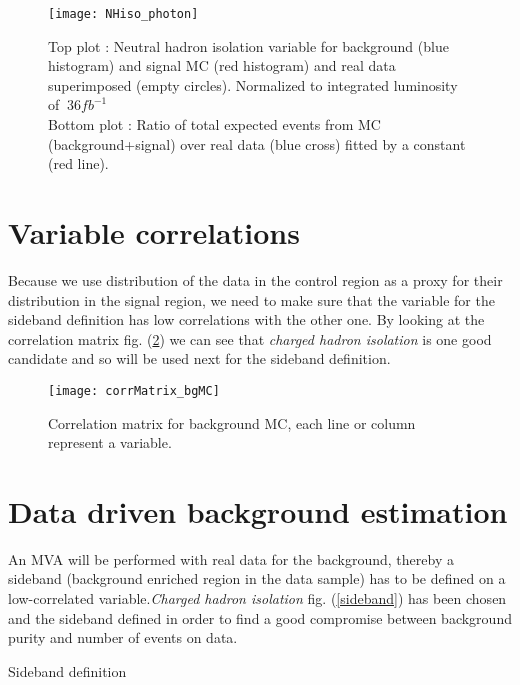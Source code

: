 \begin{figure}[h!]
  \centering
  \texttt{[image: NHiso\_photon]}\\[1cm]
  \caption{Top plot : Neutral hadron isolation variable for background (blue histogram) and signal MC (red histogram) and real data superimposed (empty circles). Normalized to integrated luminosity of $~36fb^{-1}$\\Bottom plot : Ratio of total expected events from MC (background+signal) over real data (blue cross) fitted by a constant (red line).}
  \label{NHiso_photon_dataVsMCbg}
\end{figure}

\section{Variable correlations}

Because we use distribution of the data in the control region as a proxy for their distribution in the signal region, we need to make sure that the variable for the sideband definition has low correlations with the other one. 
By looking at the correlation matrix fig. (\ref{corrMatrix_bgMC}) we can see that \emph{charged hadron isolation} is one good candidate and so will be used next for the sideband definition.\\

\begin{figure}[ht!]
  \centering
  \texttt{[image: corrMatrix\_bgMC]}\\[1cm]
  \caption{Correlation matrix for background MC, each line or column represent a variable.}
  \label{corrMatrix_bgMC}
\end{figure}

\section{Data driven background estimation}

An MVA will be performed with real data for the background, thereby a sideband (background enriched region in the data
sample) has to be defined on a low-correlated variable.\emph{Charged hadron isolation} fig. (\ref{sideband}) has been
chosen and the sideband defined in order to find a good compromise between background purity and number of events on data.
\begin{description}
	\item [Sideband definition]
\end{description}

